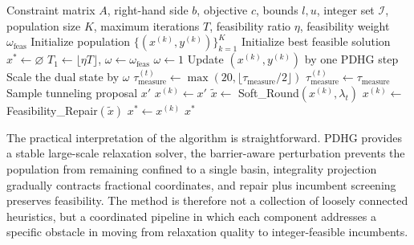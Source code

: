 \begin{algorithm}[htbp]
\caption{HP-PDHG algorithmic workflow.}
\label{alg:quantum_pop_pdhg}
\begin{algorithmic}[1]
\REQUIRE Constraint matrix $A$, right-hand side $b$, objective $c$, bounds $l,u$, integer set $\mathcal{I}$, population size $K$, maximum iterations $T$, feasibility ratio $\eta$, feasibility weight $\omega_{\mathrm{feas}}$
\STATE Initialize population $\{(x^{(k)}, y^{(k)})\}_{k=1}^K$
\STATE Initialize best feasible solution $x^* \leftarrow \varnothing$
\STATE $T_1 \leftarrow \lfloor \eta T \rfloor$, $\omega \leftarrow \omega_{\mathrm{feas}}$
        \STATE $\omega \leftarrow 1$
    \ENDIF
        \STATE Update $(x^{(k)}, y^{(k)})$ by one PDHG step
            \STATE Scale the dual state by $\omega$
            \STATE $\tau_{\text{measure}}^{(t)} \leftarrow \max(20,\lfloor \tau_{\text{measure}}/2 \rfloor)$
        \ELSE
            \STATE $\tau_{\text{measure}}^{(t)} \leftarrow \tau_{\text{measure}}$
        \ENDIF
            \STATE Sample tunneling proposal $x'$
                \STATE $x^{(k)} \leftarrow x'$
            \ENDIF
        \ENDIF
            \STATE $\tilde{x} \leftarrow$ Soft\_Round$(x^{(k)}, \lambda_t)$
            \STATE $x^{(k)} \leftarrow$ Feasibility\_Repair$(\tilde{x})$
        \ENDIF
            \STATE $x^* \leftarrow x^{(k)}$
        \ENDIF
    \ENDFOR
\ENDFOR
\RETURN $x^*$
\end{algorithmic}
\end{algorithm}

The practical interpretation of the algorithm is straightforward. PDHG provides a stable large-scale relaxation solver, the barrier-aware perturbation prevents the population from remaining confined to a single basin, integrality projection gradually contracts fractional coordinates, and repair plus incumbent screening preserves feasibility. The method is therefore not a collection of loosely connected heuristics, but a coordinated pipeline in which each component addresses a specific obstacle in moving from relaxation quality to integer-feasible incumbents.
